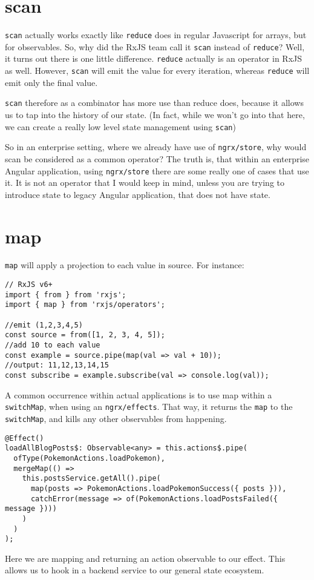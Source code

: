 \section{scan}
\lstinline{scan} actually works exactly like \lstinline{reduce} does in 
regular Javascript for arrays, but for observables. So, why did the RxJS team 
call it \lstinline{scan} instead of \lstinline{reduce}? Well, it turns out there 
is one little difference. \lstinline{reduce} actually is an operator in RxJS as
well. However, \lstinline{scan} will emit the value for every iteration, whereas 
\lstinline{reduce} will emit only the final value. 

\lstinline{scan} therefore as a combinator has more use than reduce does, 
because it allows us to tap into the history of our state. (In fact, while we
won't go into that here, we can create a really low level state management 
using \lstinline{scan})

So in an enterprise setting, where we already have use of 
\lstinline{ngrx/store}, why would scan be considered as a common operator? The 
truth is, that within an enterprise Angular application, using \lstinline{ngrx/store}
there are some really one of cases that use it. It is not an operator that I would keep 
in mind, unless you are trying to introduce state to legacy Angular application, 
that does not have state. 

\section{map} 
\lstinline{map} will apply a projection to each value in source. For instance: 
\begin{lstlisting}[caption=rxjs map example]
// RxJS v6+
import { from } from 'rxjs';
import { map } from 'rxjs/operators';

//emit (1,2,3,4,5)
const source = from([1, 2, 3, 4, 5]);
//add 10 to each value
const example = source.pipe(map(val => val + 10));
//output: 11,12,13,14,15
const subscribe = example.subscribe(val => console.log(val));
\end{lstlisting}

A common occurrence within actual applications is to use map within a 
\lstinline{switchMap}, when using an \lstinline{ngrx/effects}. That way, it 
returns the \lstinline{map} to the \lstinline{switchMap}, and kills any other
observables from happening.

\begin{lstlisting}[caption=map example]
@Effect()
loadAllBlogPosts$: Observable<any> = this.actions$.pipe(
  ofType(PokemonActions.loadPokemon),
  mergeMap(() =>
    this.postsService.getAll().pipe(
      map(posts => PokemonActions.loadPokemonSuccess({ posts })),
      catchError(message => of(PokemonActions.loadPostsFailed({ message })))
    )
  )
);  
\end{lstlisting}

Here we are mapping and returning an action observable to our effect. This 
allows us to hook in a backend service to our general state ecosystem.